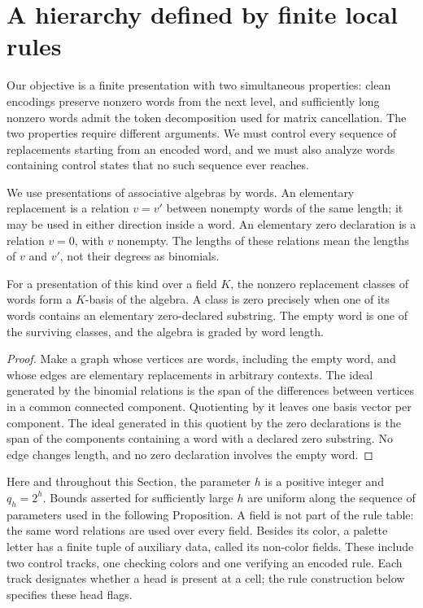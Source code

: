\section{A hierarchy defined by finite local rules}\label{sec:finite-rules}

Our objective is a finite presentation with two simultaneous
properties: clean encodings preserve nonzero words from the next level,
and sufficiently long nonzero words admit the token decomposition used
for matrix cancellation. The two properties require different arguments.
We must control every sequence of replacements starting from an encoded
word, and we must also analyze words containing control states that no
such sequence ever reaches.

We use presentations of associative algebras by words.  An elementary
replacement is a relation $v=v'$ between nonempty words of the same
length; it may be used in either direction inside a word.  An elementary
zero declaration is a relation $v=0$, with $v$ nonempty.  The lengths of
these relations mean the lengths of $v$ and $v'$, not their degrees as
binomials.

\begin{lemma}\label{fr:basis}
For a presentation of this kind over a field $K$, the nonzero
replacement classes of words form a $K$-basis of the algebra.  A class is
zero precisely when one of its words contains an elementary
zero-declared substring.  The empty word is one of the surviving
classes, and the algebra is graded by word length.
\end{lemma}

\begin{proof}
Make a graph whose vertices are words, including the empty word, and
whose edges are elementary replacements in arbitrary contexts.  The
ideal generated by the binomial relations is the span of the differences
between vertices in a common connected component.  Quotienting by it
leaves one basis vector per component.  The ideal generated in this
quotient by the zero declarations is the span of the components
containing a word with a declared zero substring.  No edge changes
length, and no zero declaration involves the empty word.
\end{proof}

Here and throughout this Section, the parameter $h$ is a positive
integer and $q_h=2^h$.  Bounds asserted for sufficiently large $h$ are
uniform along the sequence of parameters used in the following
Proposition.  A field is not part of the rule table: the same word
relations are used over every field. Besides its color, a palette
letter has a finite tuple of auxiliary data, called its non-color
fields. These include two control tracks, one checking colors and one
verifying an encoded rule.
Each track designates whether a head is present at a cell; the rule
construction below specifies these head flags.

